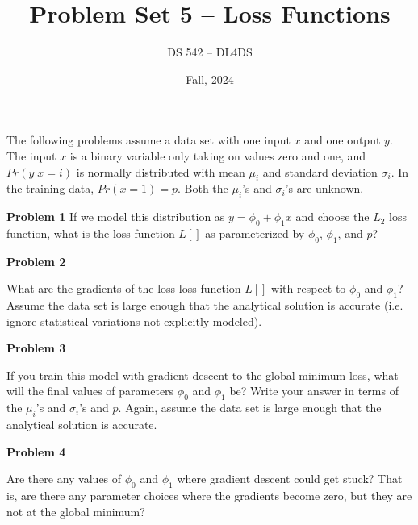 \documentclass[11pt, oneside]{article}   	%
\title{Problem Set 5 -- Loss Functions}
\author{DS 542 -- DL4DS}
\date{Fall, 2024}							%
\begin{document}
\maketitle

The following problems assume a data set with one input $x$ and one output $y$.
The input $x$ is a binary variable only taking on values zero and one, and $Pr(y|x=i)$ is normally distributed with mean $\mu_i$ and standard deviation $\sigma_i$.
In the training data, $Pr(x=1) = p$.
Both the $\mu_i$'s and $\sigma_i$'s are unknown.

\textbf{Problem 1}
If we model this distribution as $y = \phi_0 + \phi_1 x$ and choose the $L_2$ loss function, what is the loss function $L[]$ as parameterized by $\phi_0$, $\phi_1$, and $p$?

\vspace{1cm}

\textbf{Problem 2}

What are the gradients of the loss loss function $L[]$ with respect to $\phi_0$ and $\phi_1$?
Assume the data set is large enough that the analytical solution is accurate (i.e. ignore statistical variations not explicitly modeled).

\vspace{1cm}

\textbf{Problem 3}

If you train this model with gradient descent to the global minimum loss, what will the final values of parameters $\phi_0$ and $\phi_1$ be?
Write your answer in terms of the $\mu_i$'s and $\sigma_i$'s and $p$.
Again, assume the data	set is large enough that the analytical	solution is accurate.

\vspace{1cm}

\textbf{Problem 4}

Are there any values of $\phi_0$ and $\phi_1$ where gradient descent could get stuck?
That is, are there any parameter choices where the gradients become zero, but they are not at the global minimum?
\end{document}
